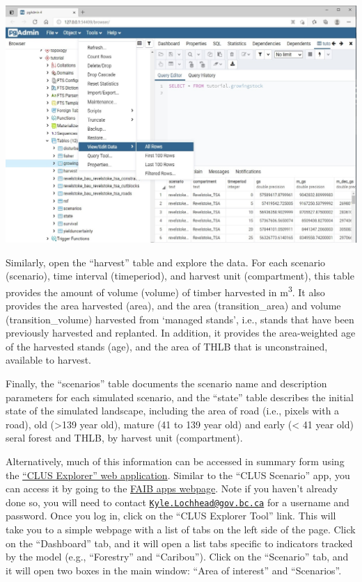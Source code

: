 \documentclass[
]{article}
\begin{document}
\includegraphics{images/pgadmin_table.jpg}

Similarly, open the ``harvest'' table and explore the data. For each
scenario (scenario), time interval (timeperiod), and harvest unit
(compartment), this table provides the amount of volume (volume) of
timber harvested in m\textsuperscript{3}. It also provides the area
harvested (area), and the area (transition\_area) and volume
(transition\_volume) harvested from `managed stands', i.e., stands that
have been previously harvested and replanted. In addition, it provides
the area-weighted age of the harvested stands (age), and the area of
THLB that is unconstrained, available to harvest.

Finally, the ``scenarios'' table documents the scenario name and
description parameters for each simulated scenario, and the ``state''
table describes the initial state of the simulated landscape, including
the area of road (i.e., pixels with a road), old (\textgreater139 year
old), mature (41 to 139 year old) and early (\textless{} 41 year old)
seral forest and THLB, by harvest unit (compartment).

Alternatively, much of this information can be accessed in summary form
using the \href{https://github.com/bcgov/clus_explorer}{``CLUS
Explorer'' web application}. Similar to the ``CLUS Scenario'' app, you
can access it by going to the
\href{http://206.12.91.188:8787/login}{FAIB apps webpage}. Note if you
haven't already done so, you will need to contact
\href{mailto:Kyle.Lochhead@gov.bc.ca}{\nolinkurl{Kyle.Lochhead@gov.bc.ca}}
for a username and password. Once you log in, click on the ``CLUS
Explorer Tool'' link. This will take you to a simple webpage with a list
of tabs on the left side of the page. Click on the ``Dashboard'' tab,
and it will open a list tabs specific to indicators tracked by the model
(e.g., ``Forestry'' and ``Caribou''). Click on the ``Scenario'' tab, and
it will open two boxes in the main window: ``Area of interest'' and
``Scenarios''.
\end{document}
